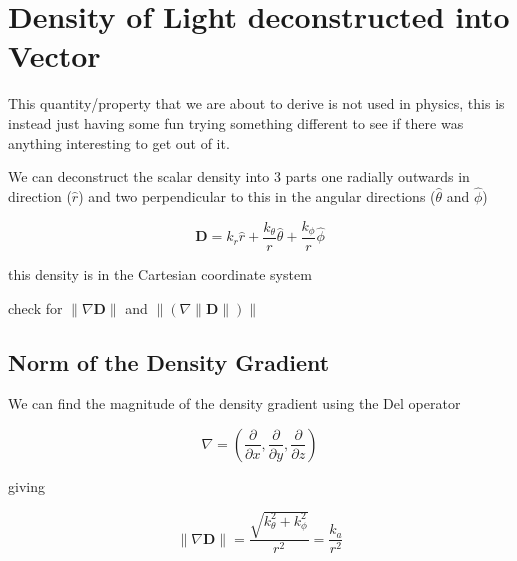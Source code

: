 \section{Density of Light deconstructed into Vector}\label{sect: Field Vector Density}

This quantity/property that we are about to derive is not used in physics, this is instead just having some fun trying something different to see if there was anything interesting to get out of it.

We can deconstruct the scalar density into 3 parts one radially outwards in direction ($\hat{r}$) and two perpendicular to this in the angular directions ($\hat{\theta}$ and $\hat{\phi}$)


\begin{equation}
	\mathbf{D} = k_r \hat{r} + \frac{k_\theta}{r} \hat{\theta} + \frac{k_\phi}{r} \hat{\phi}
\end{equation}

this density is in the Cartesian coordinate system

check for $\| \nabla  \mathbf{D} \|$ and $\| ( \nabla  \| \mathbf{D} \| ) \|$

\subsection{Norm of the Density Gradient}\label{subsect: Norm of the Density Gradient}

We can find the magnitude of the density gradient using the Del operator

\begin{equation}
	\nabla = (\frac{\partial}{\partial x},\frac{\partial}{\partial y},\frac{\partial}{\partial z})
\end{equation}

giving

\begin{equation}
	\| \nabla \mathbf{D} \| = \frac{\sqrt{k_\theta^2 + k_\phi^2 }}{r^2} = \frac{k_{a}}{r^2}
\end{equation}

